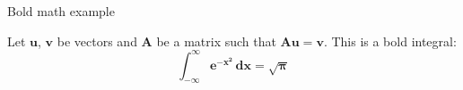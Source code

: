 \documentclass{beamer}
\begin{document}
\begin{frame}{Bold math example}

Let $\bm{u}$, $\bm{v}$ be vectors and $\bm{A}$ be a
matrix such that $\bm{Au}=\bm{v}$.
This is a bold integral:
\[
\bm{\int_{-\infty}^{\infty} e^{-x^2}\,dx=\sqrt{\pi} }
\]

\end{frame}
\end{document}
